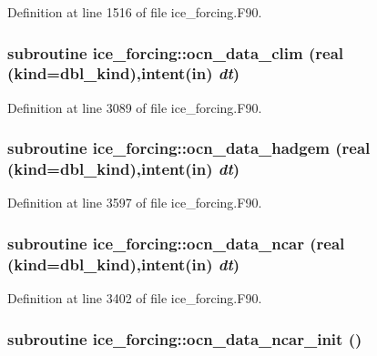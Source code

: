 Definition at line 1516 of file ice\_\-forcing.F90.\hypertarget{namespaceice__forcing_a83eb2b44b9507b6136d8ca5969356058}{
\subsubsection[{ocn\_\-data\_\-clim}]{\setlength{\rightskip}{0pt plus 5cm}subroutine ice\_\-forcing::ocn\_\-data\_\-clim (real (kind=dbl\_\-kind),intent(in) {\em dt})}}
\label{namespaceice__forcing_a83eb2b44b9507b6136d8ca5969356058}


Definition at line 3089 of file ice\_\-forcing.F90.\hypertarget{namespaceice__forcing_a6b38f04cff511ea4f70d58e89dfaf0e5}{
\subsubsection[{ocn\_\-data\_\-hadgem}]{\setlength{\rightskip}{0pt plus 5cm}subroutine ice\_\-forcing::ocn\_\-data\_\-hadgem (real (kind=dbl\_\-kind),intent(in) {\em dt})}}
\label{namespaceice__forcing_a6b38f04cff511ea4f70d58e89dfaf0e5}


Definition at line 3597 of file ice\_\-forcing.F90.\hypertarget{namespaceice__forcing_a1b5cad2ae77729861f402fa1ef5a2140}{
\subsubsection[{ocn\_\-data\_\-ncar}]{\setlength{\rightskip}{0pt plus 5cm}subroutine ice\_\-forcing::ocn\_\-data\_\-ncar (real (kind=dbl\_\-kind),intent(in) {\em dt})}}
\label{namespaceice__forcing_a1b5cad2ae77729861f402fa1ef5a2140}


Definition at line 3402 of file ice\_\-forcing.F90.\hypertarget{namespaceice__forcing_aeb55eba5600676c3b7eb42cf02d337c1}{
\subsubsection[{ocn\_\-data\_\-ncar\_\-init}]{\setlength{\rightskip}{0pt plus 5cm}subroutine ice\_\-forcing::ocn\_\-data\_\-ncar\_\-init ()}}
\label{namespaceice__forcing_aeb55eba5600676c3b7eb42cf02d337c1}


